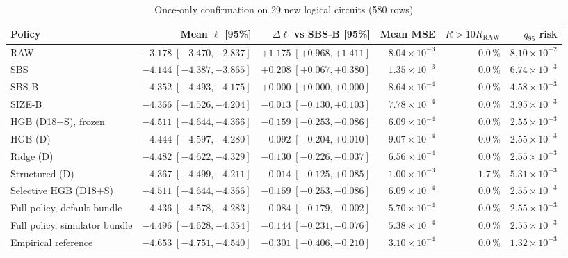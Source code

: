 \begin{table}[p]
\centering
\footnotesize
\setlength{\tabcolsep}{3.0pt}
\caption{Once-only confirmation on 29 new logical circuits (580 rows)}
\label{tab:qem180-confirmation}
\begin{tabular}{lrrrrr}
\toprule
Policy & Mean $\ell$ [95\%] & $\Delta\ell$ vs SBS-B [95\%] & Mean MSE & $R>10R_{\mathrm{RAW}}$ & $q_{95}$ risk \\
\midrule
RAW & $-3.178\;[-3.470,-2.837]$ & $+1.175\;[+0.968,+1.411]$ & $8.04\times10^{-3}$ & $0.0$\,\% & $8.10\times10^{-2}$ \\
SBS & $-4.144\;[-4.387,-3.865]$ & $+0.208\;[+0.067,+0.380]$ & $1.35\times10^{-3}$ & $0.0$\,\% & $6.74\times10^{-3}$ \\
SBS-B & $-4.352\;[-4.493,-4.175]$ & $+0.000\;[+0.000,+0.000]$ & $8.64\times10^{-4}$ & $0.0$\,\% & $4.58\times10^{-3}$ \\
SIZE-B & $-4.366\;[-4.526,-4.204]$ & $-0.013\;[-0.130,+0.103]$ & $7.78\times10^{-4}$ & $0.0$\,\% & $3.95\times10^{-3}$ \\
\midrule
HGB (D18+S), frozen & $-4.511\;[-4.644,-4.366]$ & $-0.159\;[-0.253,-0.086]$ & $6.09\times10^{-4}$ & $0.0$\,\% & $2.55\times10^{-3}$ \\
HGB (D) & $-4.444\;[-4.597,-4.280]$ & $-0.092\;[-0.204,+0.010]$ & $9.07\times10^{-4}$ & $0.0$\,\% & $2.55\times10^{-3}$ \\
Ridge (D) & $-4.482\;[-4.622,-4.329]$ & $-0.130\;[-0.226,-0.037]$ & $6.56\times10^{-4}$ & $0.0$\,\% & $2.55\times10^{-3}$ \\
Structured (D) & $-4.367\;[-4.499,-4.211]$ & $-0.014\;[-0.125,+0.085]$ & $1.00\times10^{-3}$ & $1.7$\,\% & $5.31\times10^{-3}$ \\
Selective HGB (D18+S) & $-4.511\;[-4.644,-4.366]$ & $-0.159\;[-0.253,-0.086]$ & $6.09\times10^{-4}$ & $0.0$\,\% & $2.55\times10^{-3}$ \\
\midrule
Full policy, default bundle & $-4.436\;[-4.578,-4.283]$ & $-0.084\;[-0.179,-0.002]$ & $5.70\times10^{-4}$ & $0.0$\,\% & $2.55\times10^{-3}$ \\
Full policy, simulator bundle & $-4.496\;[-4.628,-4.354]$ & $-0.144\;[-0.231,-0.076]$ & $5.38\times10^{-4}$ & $0.0$\,\% & $2.55\times10^{-3}$ \\
\midrule
Empirical reference & $-4.653\;[-4.751,-4.540]$ & $-0.301\;[-0.406,-0.210]$ & $3.10\times10^{-4}$ & $0.0$\,\% & $1.32\times10^{-3}$ \\

\end{tabular}
\end{table}
